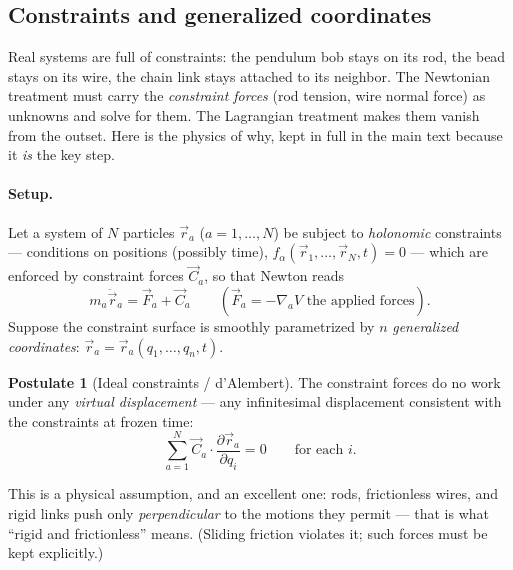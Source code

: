 \documentclass[11pt]{article}
\theoremstyle{plain}
\theoremstyle{definition}
\newtheorem{postulate}[theorem]{Postulate}
\theoremstyle{remark}
\newcommand{\pd}[2]{\frac{\partial #1}{\partial #2}}
\newcommand{\vr}{\vec{r}}
\begin{document}
\subsection{Constraints and generalized coordinates}
\label{sec:constraints}

Real systems are full of constraints: the pendulum bob stays on its rod,
the bead stays on its wire, the chain link stays attached to its neighbor.
The Newtonian treatment must carry the \emph{constraint forces} (rod
tension, wire normal force) as unknowns and solve for them. The Lagrangian
treatment makes them vanish from the outset. Here is the physics of why,
kept in full in the main text because it \emph{is} the key step.

\paragraph{Setup.}
Let a system of $N$ particles $\vr_a$ ($a = 1,\dots,N$) be subject to
\emph{holonomic} constraints --- conditions on positions (possibly time),
$f_\alpha(\vr_1,\dots,\vr_N, t) = 0$ --- which are enforced by constraint
forces $\vec C_a$, so that Newton reads
\begin{equation}
  m_a \ddot\vr_a = \vec F_a + \vec C_a
  \qquad (\vec F_a = -\nabla_a V \text{ the applied forces}).
  \label{eq:newton-constrained}
\end{equation}
Suppose the constraint surface is smoothly parametrized by $n$
\emph{generalized coordinates}:
$\vr_a = \vr_a(q_1,\dots,q_n, t)$.

\begin{postulate}[Ideal constraints / d'Alembert]\label{post:dalembert}
The constraint forces do no work under any \emph{virtual displacement} ---
any infinitesimal displacement consistent with the constraints at frozen
time:
\begin{equation}
  \sum_{a=1}^N \vec C_a \cdot \pd{\vr_a}{q_i} = 0
  \qquad \text{for each } i .
\end{equation}
\end{postulate}

This is a physical assumption, and an excellent one: rods, frictionless
wires, and rigid links push only \emph{perpendicular} to the motions they
permit --- that is what ``rigid and frictionless'' means. (Sliding
friction violates it; such forces must be kept explicitly.)
\end{document}
